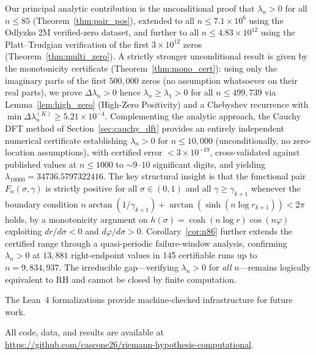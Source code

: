 \documentclass[11pt]{article}
\begin{document}
Our principal analytic contribution is the unconditional proof that $\lambda_n > 0$ for
all $n \le 85$ (Theorem~\ref{thm:pair_pos}), extended to all $n \le 7.1\times10^6$
using the Odlyzko 2M verified-zero dataset, and further to all $n \le 4.83\times10^{12}$
using the Platt--Trudgian verification of the first $3\times10^{12}$ zeros \cite{platt2021}
(Theorem~\ref{thm:multi_zero}).
A strictly stronger unconditional result is given by the monotonicity certificate
(Theorem~\ref{thm:mono_cert}): using only the imaginary parts of the first $500{,}000$ zeros
(no assumption whatsoever on their real parts), we prove $\Delta\lambda_n > 0$ hence
$\lambda_n \ge \lambda_1 > 0$ for all $n \le 499{,}739$ via Lemma~\ref{lem:high_zero}
(High-Zero Positivity) and a Chebyshev recurrence with $\min\Delta\lambda_n^{(K)} \ge 5.21\times10^{-4}$.
Complementing the analytic approach, the Cauchy DFT method of
Section~\ref{sec:cauchy_dft} provides an entirely independent numerical certificate
establishing $\lambda_n > 0$ for $n \le 10{,}000$ (unconditionally, no zero-location
assumptions), with certified error $< 3\times10^{-19}$, cross-validated against
published values at $n \le 1000$ to $\sim 9$--$10$ significant digits,
and yielding $\lambda_{10000} = 34736.5797322416$.
The key structural insight is that the functional pair $F_n(\sigma,\gamma)$ is strictly
positive for all $\sigma \in (0,1)$ and all $\gamma \ge \gamma_{k+1}$ whenever the
boundary condition $n\arctan(1/\gamma_{k+1}) + \arctan(\sinh(n\log r_{k+1})) < 2\pi$ holds,
by a monotonicity argument on $h(\sigma) = \cosh(n\log r)\cos(n\varphi)$ exploiting
$dr/d\sigma < 0$ and $d\varphi/d\sigma > 0$.  Corollary~\ref{cor:n86} further
extends the certified range through a quasi-periodic failure-window analysis,
confirming $\lambda_n > 0$ at $13{,}881$ right-endpoint values in 145 certifiable runs
up to $n = 9{,}834{,}937$.  The irreducible gap---verifying $\lambda_n > 0$ for \emph{all}
$n$---remains logically equivalent to RH and cannot be closed by finite computation.

The Lean~4 formalizations provide machine-checked infrastructure for future work.

All code, data, and results are available at
\url{https://github.com/cascone26/riemann-hypothesis-computational}.
\end{document}
